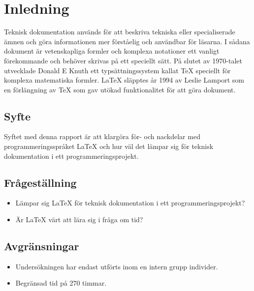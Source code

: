 \section{Inledning}
Teknisk dokumentation används för att beskriva tekniska eller specialiserade ämnen och göra informationen mer förståelig och användbar för läsarna. I sådana dokument är vetenskapliga formler och komplexa notationer ett vanligt förekommande och behöver skrivas på ett speciellt sätt.  
\newline
\newline
På slutet av 1970-talet utvecklade Donald E Knuth ett typsättningssystem kallat {\TeX} speciellt för komplexa matematiska formler. {\LaTeX} släpptes år 1994 av Leslie Lamport som en förlängning av {\TeX} som gav utökad funktionalitet för att göra dokument. \citep{latexandfriends}  

\subsection{Syfte}
Syftet med denna rapport är att klargöra för- och nackdelar med programmeringsspråket {\LaTeX} och hur väl det lämpar sig för teknisk dokumentation i ett programmeringsprojekt. 

\subsection{Frågeställning}
\begin{itemize}
\item Lämpar sig {\LaTeX} för teknisk dokumentation i ett programmeringsprojekt? 
\item Är {\LaTeX} värt att lära sig i fråga om tid?
\end{itemize}
		
\subsection{Avgränsningar}
\begin{itemize}
	\item Undersökningen har endast utförts inom en intern grupp individer.
	\item Begränsad tid på 270 timmar. 
\end{itemize}

	